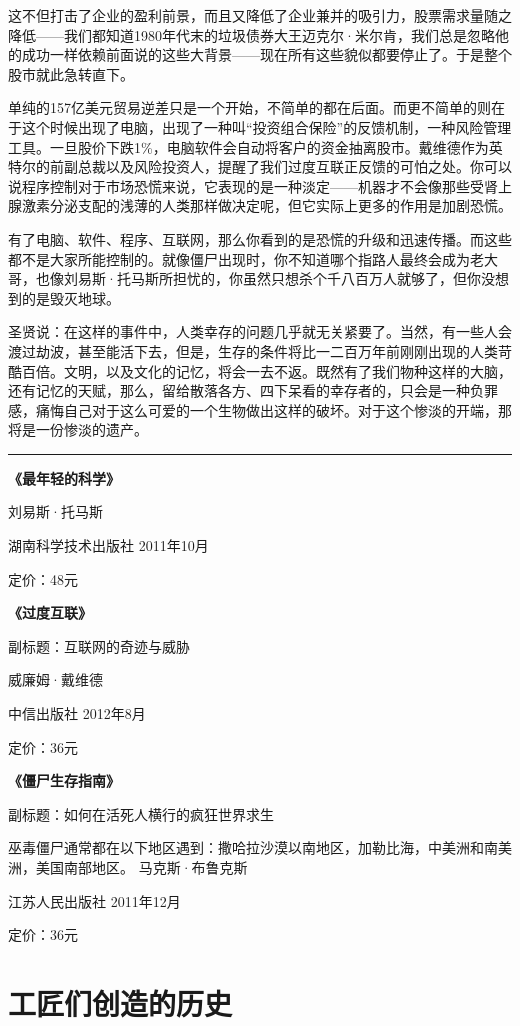 这不但打击了企业的盈利前景，而且又降低了企业兼并的吸引力，股票需求量随之降低------我们都知道1980年代末的垃圾债券大王迈克尔·米尔肯，我们总是忽略他的成功一样依赖前面说的这些大背景------现在所有这些貌似都要停止了。于是整个股市就此急转直下。

单纯的157亿美元贸易逆差只是一个开始，不简单的都在后面。而更不简单的则在于这个时候出现了电脑，出现了一种叫``投资组合保险''的反馈机制，一种风险管理工具。一旦股价下跌1\%，电脑软件会自动将客户的资金抽离股市。戴维德作为英特尔的前副总裁以及风险投资人，提醒了我们过度互联正反馈的可怕之处。你可以说程序控制对于市场恐慌来说，它表现的是一种淡定------机器才不会像那些受肾上腺激素分泌支配的浅薄的人类那样做决定呢，但它实际上更多的作用是加剧恐慌。

有了电脑、软件、程序、互联网，那么你看到的是恐慌的升级和迅速传播。而这些都不是大家所能控制的。就像僵尸出现时，你不知道哪个指路人最终会成为老大哥，也像刘易斯·托马斯所担忧的，你虽然只想杀个千八百万人就够了，但你没想到的是毁灭地球。

圣贤说：在这样的事件中，人类幸存的问题几乎就无关紧要了。当然，有一些人会渡过劫波，甚至能活下去，但是，生存的条件将比一二百万年前刚刚出现的人类苛酷百倍。文明，以及文化的记忆，将会一去不返。既然有了我们物种这样的大脑，还有记忆的天赋，那么，留给散落各方、四下呆看的幸存者的，只会是一种负罪感，痛悔自己对于这么可爱的一个生物做出这样的破坏。对于这个惨淡的开端，那将是一份惨淡的遗产。

\begin{center}\rule{0.5\linewidth}{0.5pt}\end{center}

\textbf{《最年轻的科学》}

刘易斯·托马斯

湖南科学技术出版社 2011年10月

定价：48元

\textbf{《过度互联》}

副标题：互联网的奇迹与威胁

威廉姆·戴维德

中信出版社 2012年8月

定价：36元

\textbf{《僵尸生存指南》}

副标题：如何在活死人横行的疯狂世界求生

巫毒僵尸通常都在以下地区遇到：撒哈拉沙漠以南地区，加勒比海，中美洲和南美洲，美国南部地区。
马克斯·布鲁克斯

江苏人民出版社 2011年12月

定价：36元

\hypertarget{ux5de5ux5320ux4eecux521bux9020ux7684ux5386ux53f2}{%
\section{工匠们创造的历史}\label{ux5de5ux5320ux4eecux521bux9020ux7684ux5386ux53f2}}

